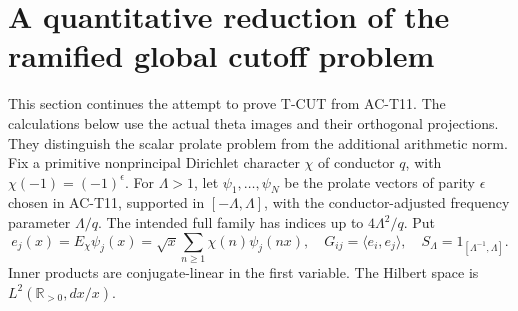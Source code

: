 \section{A quantitative reduction of the ramified global cutoff problem}
\label{sec:ACcutoffbridge}

This section continues the attempt to prove T-CUT from AC-T11.
The calculations below use the actual theta images and their
orthogonal projections.  They distinguish the scalar prolate
problem from the additional arithmetic norm.
Fix a primitive nonprincipal Dirichlet character \(\chi\) of
conductor \(q\), with \(\chi(-1)=(-1)^\epsilon\).
For \(\Lambda>1\), let \(\psi_1,\ldots,\psi_N\) be the prolate
vectors of parity \(\epsilon\) chosen in AC-T11, supported in
\([-\Lambda,\Lambda]\), with the conductor-adjusted frequency
parameter \(\Lambda/q\).  The intended full family has indices
up to \(4\Lambda^2/q\).
Put
\[
 e_j(x)=E_\chi\psi_j(x)
   =\sqrt{x}\sum_{n\geq1}\chi(n)\psi_j(nx),\quad
 G_{ij}=\langle e_i,e_j\rangle,\quad
 S_\Lambda=1_{[\Lambda^{-1},\Lambda]}.
\]
Inner products are conjugate-linear in the first variable.
The Hilbert space is \(L^2(\mathbb R_{>0},dx/x)\).

